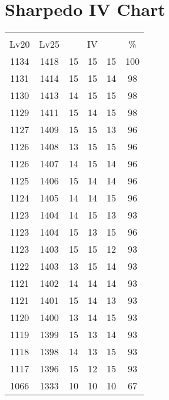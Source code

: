 \documentclass{article}%
\begin{document}
%
\normalsize%
\section{Sharpedo IV Chart}%
\label{sec:Sharpedo IV Chart}%
\renewcommand{\arraystretch}{1.5}%
\begin{tabular}{|c|c|c|c|c|c|}%
\hline%
\multicolumn{6}{|c|}{\textcolor{white}{ 
\linebreak{Sharpedo}
}%
\cellcolor{black}}\\%
\multicolumn{1}{|c}{Lv20}&\multicolumn{1}{c|}{Lv25}&\multicolumn{3}{c|}{IV}&\multicolumn{1}{|c|}{\%}\\%
\hline%
\rowcolor{color100}%
1134&1418&15&15&15&100\\%
\hline%
\rowcolor{color98}%
1131&1414&15&15&14&98\\%
\hline%
\rowcolor{color98}%
1130&1413&14&15&15&98\\%
\hline%
\rowcolor{color98}%
1129&1411&15&14&15&98\\%
\hline%
\rowcolor{color96}%
1127&1409&15&15&13&96\\%
\hline%
\rowcolor{color96}%
1126&1408&13&15&15&96\\%
\hline%
\rowcolor{color96}%
1126&1407&14&15&14&96\\%
\hline%
\rowcolor{color96}%
1125&1406&15&14&14&96\\%
\hline%
\rowcolor{color96}%
1124&1405&14&14&15&96\\%
\hline%
\rowcolor{color93}%
1123&1404&14&15&13&93\\%
\hline%
\rowcolor{color96}%
1123&1404&15&13&15&96\\%
\hline%
\rowcolor{color93}%
1123&1403&15&15&12&93\\%
\hline%
\rowcolor{color93}%
1122&1403&13&15&14&93\\%
\hline%
\rowcolor{color93}%
1121&1402&14&14&14&93\\%
\hline%
\rowcolor{color93}%
1121&1401&15&14&13&93\\%
\hline%
\rowcolor{color93}%
1120&1400&13&14&15&93\\%
\hline%
\rowcolor{color93}%
1119&1399&15&13&14&93\\%
\hline%
\rowcolor{color93}%
1118&1398&14&13&15&93\\%
\hline%
\rowcolor{color93}%
1117&1396&15&12&15&93\\%
\hline%
\rowcolor{color91}%
1066&1333&10&10&10&67\\%
\end{tabular}

%
\end{document}

